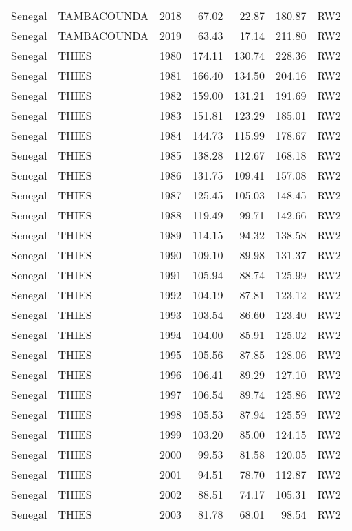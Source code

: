 \begin{longtable}{lllrrrl}
  Senegal & TAMBACOUNDA & 2018 & 67.02 & 22.87 & 180.87 & RW2 \\ 
  Senegal & TAMBACOUNDA & 2019 & 63.43 & 17.14 & 211.80 & RW2 \\ 
  Senegal & THIES & 1980 & 174.11 & 130.74 & 228.36 & RW2 \\ 
  Senegal & THIES & 1981 & 166.40 & 134.50 & 204.16 & RW2 \\ 
  Senegal & THIES & 1982 & 159.00 & 131.21 & 191.69 & RW2 \\ 
  Senegal & THIES & 1983 & 151.81 & 123.29 & 185.01 & RW2 \\ 
  Senegal & THIES & 1984 & 144.73 & 115.99 & 178.67 & RW2 \\ 
  Senegal & THIES & 1985 & 138.28 & 112.67 & 168.18 & RW2 \\ 
  Senegal & THIES & 1986 & 131.75 & 109.41 & 157.08 & RW2 \\ 
  Senegal & THIES & 1987 & 125.45 & 105.03 & 148.45 & RW2 \\ 
  Senegal & THIES & 1988 & 119.49 & 99.71 & 142.66 & RW2 \\ 
  Senegal & THIES & 1989 & 114.15 & 94.32 & 138.58 & RW2 \\ 
  Senegal & THIES & 1990 & 109.10 & 89.98 & 131.37 & RW2 \\ 
  Senegal & THIES & 1991 & 105.94 & 88.74 & 125.99 & RW2 \\ 
  Senegal & THIES & 1992 & 104.19 & 87.81 & 123.12 & RW2 \\ 
  Senegal & THIES & 1993 & 103.54 & 86.60 & 123.40 & RW2 \\ 
  Senegal & THIES & 1994 & 104.00 & 85.91 & 125.02 & RW2 \\ 
  Senegal & THIES & 1995 & 105.56 & 87.85 & 128.06 & RW2 \\ 
  Senegal & THIES & 1996 & 106.41 & 89.29 & 127.10 & RW2 \\ 
  Senegal & THIES & 1997 & 106.54 & 89.74 & 125.86 & RW2 \\ 
  Senegal & THIES & 1998 & 105.53 & 87.94 & 125.59 & RW2 \\ 
  Senegal & THIES & 1999 & 103.20 & 85.00 & 124.15 & RW2 \\ 
  Senegal & THIES & 2000 & 99.53 & 81.58 & 120.05 & RW2 \\ 
  Senegal & THIES & 2001 & 94.51 & 78.70 & 112.87 & RW2 \\ 
  Senegal & THIES & 2002 & 88.51 & 74.17 & 105.31 & RW2 \\ 
  Senegal & THIES & 2003 & 81.78 & 68.01 & 98.54 & RW2 \\ 

\end{longtable}
